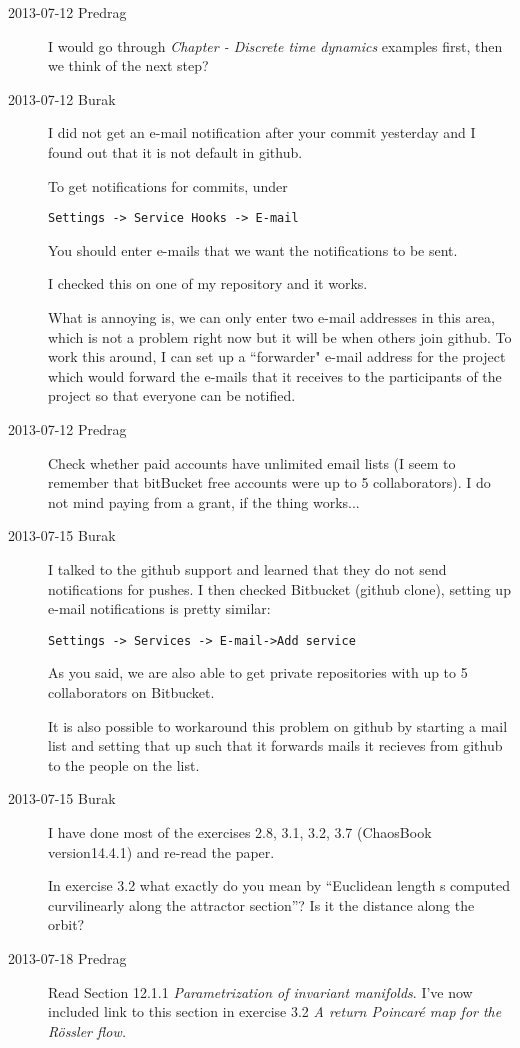 \begin{description}
\item[2013-07-12  Predrag] I would go through
 {\em Chapter  - Discrete time dynamics} examples first, then
we think of the next step?

\item[2013-07-12  Burak]
I did not get an e-mail notification after your commit yesterday and I found out that it is not default in github.

To get notifications for commits, under
\begin{verbatim}
Settings -> Service Hooks -> E-mail
\end{verbatim}
You should enter e-mails that we want the notifications to be sent.

I checked this on one of my repository and it works.

What is annoying is, we can only enter two e-mail addresses in this area, which is not a problem right now but it will be when others join github. To work this around, I can set up a ``forwarder" e-mail address for the project which would forward the e-mails that it receives to the participants of the project so that everyone can be notified.
\item[2013-07-12  Predrag] Check whether paid accounts have unlimited email lists (I seem to remember that bitBucket free accounts were up to 5 collaborators). I
    do not mind paying from a grant, if the thing works...

\item[2013-07-15  Burak]
I talked to the github support and learned that they do not send notifications for pushes. I then checked Bitbucket (github clone), setting up e-mail notifications is pretty similar:
\begin{verbatim}
Settings -> Services -> E-mail->Add service
\end{verbatim}
As you said, we are also able to get private repositories with up to 5 collaborators on Bitbucket.

It is also possible to workaround this problem on github by starting a mail list and setting that up such that it forwards mails it recieves from github to the people on the list.

\item[2013-07-15  Burak]
I have done most of the exercises 2.8, 3.1, 3.2, 3.7 (ChaosBook
version14.4.1) and re-read the paper.

In exercise 3.2 what exactly do you mean by ``Euclidean length s
computed curvilinearly along the attractor section''? Is it the
distance along the orbit?
\item[2013-07-18  Predrag] Read
Section 12.1.1 {\em Parametrization of invariant manifolds}. I've now
included link to this section in exercise 3.2 {\em A return Poincar\'e
map for the R\"ossler flow.}


\end{description}
